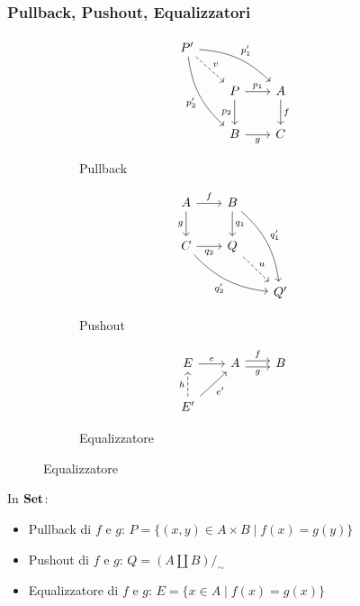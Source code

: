 \documentclass[8pt]{beamer}
\begin{document}
\begin{frame}[fragile]\frametitle{Pullback, Pushout, Equalizzatori}
	\begin{figure}[h]
		\begin{subfigure}{0.25\textwidth}
			\[\begin{tikzcd}[row sep = 20, column sep = 20]
				P' \arrow[dr, dashed, "v"] \arrow[drr, "{p_1'}", bend left=20] \arrow[ddr, "{p_2'}"swap, bend right=20] & & \\
 									& P \arrow[r, "{p_1}"] \arrow[d, "{p_2}"swap] 			& A \arrow[d, "f"] \\
									& B \arrow[r, "g"swap] 						& C
			\end{tikzcd}\]
			\caption{Pullback}
			\label{fig:pg}
		\end{subfigure}
		\qquad
		\begin{subfigure}{0.25\textwidth}
			\[\begin{tikzcd}[row sep = 20, column sep = 20]
				A \arrow[r, "f"] \arrow[d, "g"swap] 	& B \arrow[d, "{q_1}"] 	\arrow[ddr, "{q_1'}", bend left=20]	& \\
				C \arrow[r, "{q_2}"swap]  \arrow[drr, "{q_2'}"swap, bend right=20] & Q \arrow[dr, dashed, "u"] 	& \\
							& 				& Q'
			\end{tikzcd}\]
			\caption{Pushout}
			\label{po}
		\end{subfigure}
		\qquad
		\begin{subfigure}{0.25\textwidth}
			\[\begin{tikzcd}[row sep = 20, column sep = 20]
				E \arrow[r, "e"] & A \arrow[r, "f", shift left=1] \arrow[r,"g"swap, shift right = 1] & B \\
				E' \arrow[u, dashed, "h"] \arrow[ur, "{e'}"swap] &
			\end{tikzcd}\]
			\caption{Equalizzatore}
			\label{eq}
		\end{subfigure}
	\end{figure}

	In $\mathbf{Set}$:
	\begin{itemize}
		\item Pullback di $f$ e $g$: $ P = \{(x, y) \in A \times B \mid f(x) = g (y)\}$
		\item Pushout di $f$ e $g$:  $Q = (A \coprod B)/_\sim$
		\item Equalizzatore di $f$ e $g$: $E=\{x \in A \mid f(x) = g(x)\}$
	\end{itemize}
\end{frame}
\end{document}
